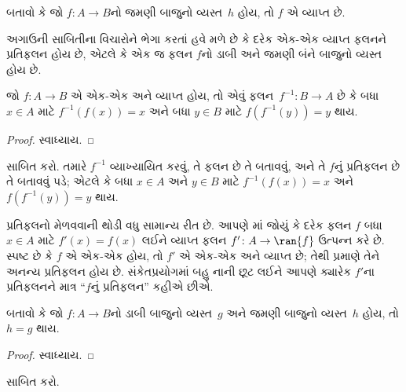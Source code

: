 \begin{prob}
બતાવો કે જો $f\colon A \to B$નો જમણી બાજુનો
વ્યસ્ત~$h$ હોય, તો $f$ એ વ્યાપ્ત છે.
\end{prob}

\begin{explain}
અગાઉની સાબિતીના વિચારોને ભેગા કરતાં હવે મળે છે કે
દરેક એક-એક વ્યાપ્ત ફલનને પ્રતિફલન હોય છે, એટલે કે
એક જ ફલન $f$નો ડાબી અને જમણી બંને બાજુનો વ્યસ્ત હોય છે.
\end{explain}

\begin{prop}
જો $f\colon A \to B$ એ એક-એક અને વ્યાપ્ત હોય, તો એવું
ફલન~$f^{-1}\colon B \to A$ છે કે બધા $x \in A$
માટે $f^{-1}(f(x)) = x$ અને બધા $y \in B$
માટે $f(f^{-1}(y)) = y$ થાય.
\end{prop}

\begin{proof}
સ્વાધ્યાય.
\end{proof}

\begin{prob}
 સાબિત કરો.
તમારે $f^{-1}$ વ્યાખ્યાયિત કરવું, તે ફલન છે તે
બતાવવું, અને તે $f$નું પ્રતિફલન છે તે બતાવવું પડે;
એટલે કે બધા $x \in A$ અને $y \in B$ માટે
$f^{-1}(f(x)) = x$ અને $f(f^{-1}(y)) = y$ થાય.
\end{prob}

\begin{explain}
પ્રતિફલનો મેળવવાની થોડી વધુ સામાન્ય રીત છે.
આપણે માં જોયું કે દરેક ફલન $f$
બધા $x \in A$ માટે $f'(x) = f(x)$ લઈને
વ્યાપ્ત ફલન $f'
\colon A \to \ran{f}$ ઉત્પન્ન કરે છે.
સ્પષ્ટ છે કે $f$ એ એક-એક હોય, તો
$f'$ એ એક-એક અને વ્યાપ્ત છે; તેથી
 પ્રમાણે તેને અનન્ય
પ્રતિફલન હોય છે. સંકેતપ્રયોગમાં બહુ નાની છૂટ લઈને
આપણે ક્યારેક $f'$ના પ્રતિફલનને માત્ર
“$f$નું પ્રતિફલન” કહીએ છીએ.
\end{explain}

\begin{prop}%
બતાવો કે જો $f\colon A \to B$નો ડાબી બાજુનો
વ્યસ્ત~$g$ અને જમણી બાજુનો વ્યસ્ત~$h$ હોય,
તો $h = g$ થાય.
\end{prop}

\begin{proof}
સ્વાધ્યાય.
\end{proof}

\begin{prob}
 સાબિત કરો.
\end{prob}

